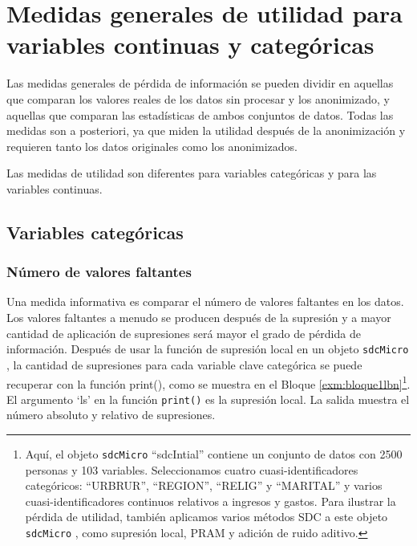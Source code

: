 \documentclass[]{book}
\theoremstyle{definition}
\theoremstyle{definition}
\theoremstyle{definition}
\theoremstyle{definition}
\theoremstyle{remark}
\begin{document}
\hypertarget{medidas-generales-de-utilidad-para-variables-continuas-y-categuxf3ricas}{%
\section{Medidas generales de utilidad para variables continuas y categóricas}\label{medidas-generales-de-utilidad-para-variables-continuas-y-categuxf3ricas}}

Las medidas generales de pérdida de información se pueden dividir en
aquellas que comparan los valores reales de los datos sin procesar y los
anonimizado, y aquellas que comparan las estadísticas de ambos conjuntos
de datos. Todas las medidas son a posteriori, ya que miden la utilidad
después de la anonimización y requieren tanto los datos originales como
los anonimizados.

Las medidas de utilidad son diferentes para variables categóricas y para
las variables continuas.

\hypertarget{variables-categuxf3ricas}{%
\subsection{Variables categóricas}\label{variables-categuxf3ricas}}

\hypertarget{nuxfamero-de-valores-faltantes}{%
\subsubsection{Número de valores faltantes}\label{nuxfamero-de-valores-faltantes}}

Una medida informativa es comparar el número de valores faltantes en los datos. Los valores faltantes a menudo se producen después de la supresión y a mayor cantidad de aplicación de supresiones será mayor el grado de pérdida de información. Después de usar la función de supresión local en un objeto \texttt{sdcMicro} , la cantidad de supresiones para cada variable clave categórica se puede recuperar con la función print(), como se muestra en el Bloque \ref{exm:bloque1lbn}\footnote{Aquí, el objeto \texttt{sdcMicro} ``sdcIntial'' contiene un conjunto de datos con 2500 personas y 103 variables. Seleccionamos cuatro cuasi-identificadores categóricos: ``URBRUR'', ``REGION'', ``RELIG'' y ``MARITAL'' y varios cuasi-identificadores continuos relativos a ingresos y gastos. Para ilustrar la pérdida de utilidad, también aplicamos varios métodos SDC a este objeto \texttt{sdcMicro} , como supresión local, PRAM y adición de ruido aditivo.}. El argumento `ls' en la función \texttt{print()} es la supresión local. La salida muestra el número absoluto y relativo de supresiones.
\end{document}
